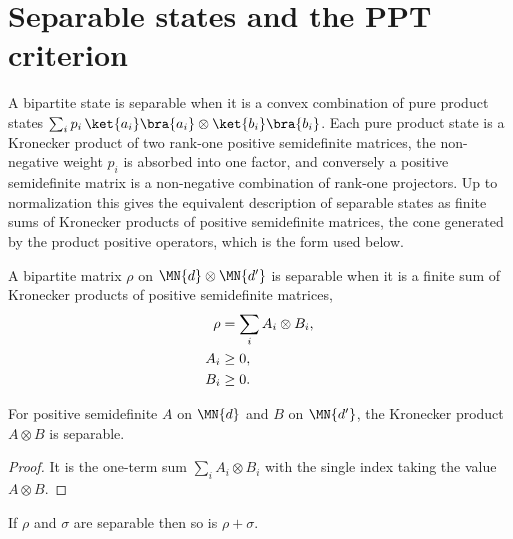 \section{Separable states and the PPT criterion}

A bipartite state is separable when it is a convex combination of pure product
states $\sum_i p_i\,\ket{a_i}\bra{a_i}\otimes\ket{b_i}\bra{b_i}$. Each pure product
state is a Kronecker product of two rank-one positive semidefinite matrices, the
non-negative weight $p_i$ is absorbed into one factor, and conversely a positive
semidefinite matrix is a non-negative combination of rank-one projectors. Up to
normalization this gives the equivalent description of separable states as finite
sums of Kronecker products of positive semidefinite matrices, the cone generated by
the product positive operators, which is the form used below.

\begin{definition}
    \label{def:is_separable}
    \leanok
    A bipartite matrix $\rho$ on $\MN{d}\otimes\MN{d'}$ is separable when it is a
    finite sum of Kronecker products of positive semidefinite matrices,
    \begin{align}
        \rho&=\sum_i A_i\otimes B_i,
        \notag\\
        A_i&\ge 0,
        \notag\\
        B_i&\ge 0.
        \notag
    \end{align}
\end{definition}

\begin{theorem}
    \label{thm:is_separable_kronecker}
    \leanok
    For positive semidefinite $A$ on $\MN{d}$ and $B$ on $\MN{d'}$, the Kronecker
    product $A\otimes B$ is separable.
\end{theorem}

\begin{proof}
    \leanok
    It is the one-term sum $\sum_i A_i\otimes B_i$ with the single index taking the
    value $A\otimes B$.
\end{proof}

\begin{theorem}
    \label{thm:is_separable_add}
    \leanok
    If $\rho$ and $\sigma$ are separable then so is $\rho+\sigma$.
\end{theorem}

